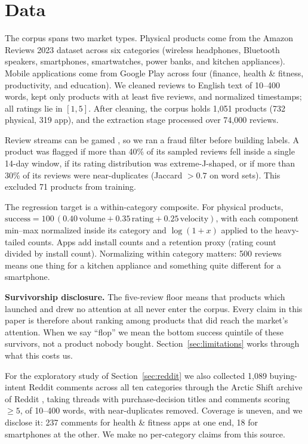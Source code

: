 \documentclass[journal]{IEEEtran}
\begin{document}
\section{Data}
\label{sec:data}
The corpus spans two market types. Physical products come from the Amazon Reviews 2023 dataset \cite{hou2024amazon} across six categories (wireless headphones, Bluetooth speakers, smartphones, smartwatches, power banks, and kitchen appliances). Mobile applications come from Google Play across four (finance, health \& fitness, productivity, and education). We cleaned reviews to English text of 10--400 words, kept only products with at least five reviews, and normalized timestamps; all ratings lie in $[1,5]$. After cleaning, the corpus holds 1{,}051 products (732 physical, 319 app), and the extraction stage processed over 74{,}000 reviews.

Review streams can be gamed \cite{jindal2008opinion,mayzlin2014promotional}, so we ran a fraud filter before building labels. A product was flagged if more than 40\% of its sampled reviews fell inside a single 14-day window, if its rating distribution was extreme-J-shaped, or if more than 30\% of its reviews were near-duplicates (Jaccard $> 0.7$ on word sets). This excluded 71 products from training.

The regression target is a within-category composite. For physical products, $\text{success} = 100\,(0.40\,\text{volume} + 0.35\,\text{rating} + 0.25\,\text{velocity})$, with each component min--max normalized inside its category and $\log(1+x)$ applied to the heavy-tailed counts. Apps add install counts and a retention proxy (rating count divided by install count). Normalizing within category matters: 500 reviews means one thing for a kitchen appliance and something quite different for a smartphone.

\textbf{Survivorship disclosure.} The five-review floor means that products which launched and drew no attention at all never enter the corpus. Every claim in this paper is therefore about ranking among products that did reach the market's attention. When we say ``flop'' we mean the bottom success quintile of these survivors, not a product nobody bought. Section~\ref{sec:limitations} works through what this costs us.

For the exploratory study of Section~\ref{sec:reddit} we also collected 1{,}089 buying-intent Reddit comments across all ten categories through the Arctic Shift archive of Reddit \cite{baumgartner2020pushshift}, taking threads with purchase-decision titles and comments scoring $\geq 5$, of 10--400 words, with near-duplicates removed. Coverage is uneven, and we disclose it: 237 comments for health \& fitness apps at one end, 18 for smartphones at the other. We make no per-category claims from this source.
\end{document}
